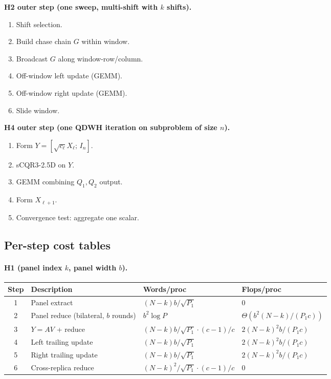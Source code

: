 \documentclass[11pt]{article}
\begin{document}
\textbf{H2 outer step (one sweep, multi-shift with $k$ shifts).}
\begin{enumerate}[leftmargin=2em]
  \item Shift selection.
  \item Build chase chain $G$ within window.
  \item Broadcast $G$ along window-row/column.
  \item Off-window left update (GEMM).
  \item Off-window right update (GEMM).
  \item Slide window.
\end{enumerate}

\textbf{H4 outer step (one QDWH iteration on subproblem of size $n$).}
\begin{enumerate}[leftmargin=2em]
  \item Form $Y = [\sqrt{c_\ell} X_\ell;\, I_n]$.
  \item sCQR3-2.5D on $Y$.
  \item GEMM combining $Q_1, Q_2$ output.
  \item Form $X_{\ell+1}$.
  \item Convergence test: aggregate one scalar.
\end{enumerate}

\subsection{Per-step cost tables}
\label{sec:B3d}

\paragraph{H1 (panel index $k$, panel width $b$).}
\begin{center}
\begin{tabular}{@{}clll@{}}
\toprule
Step & Description                          & Words/proc                                       & Flops/proc \\
\midrule
1 & Panel extract                            & $(N-k)b/\sqrt{P_1}$                              & $0$ \\
2 & Panel reduce (bilateral, $b$ rounds)     & $b^2 \log P$                                     & $\Theta(b^2(N-k)/(P_1 c))$ \\
3 & $Y = AV$ + reduce                        & $(N-k)b/\sqrt{P_1}\cdot(c{-}1)/c$                & $2(N-k)^2 b / (P_1 c)$ \\
4 & Left trailing update                     & $(N-k)b/\sqrt{P_1}$                              & $2(N-k)^2 b / (P_1 c)$ \\
5 & Right trailing update                    & $(N-k)b/\sqrt{P_1}$                              & $2(N-k)^2 b / (P_1 c)$ \\
6 & Cross-replica reduce                     & $(N-k)^2/\sqrt{P_1} \cdot (c-1)/c$               & $0$ \\
\bottomrule
\end{tabular}
\end{center}
\end{document}
